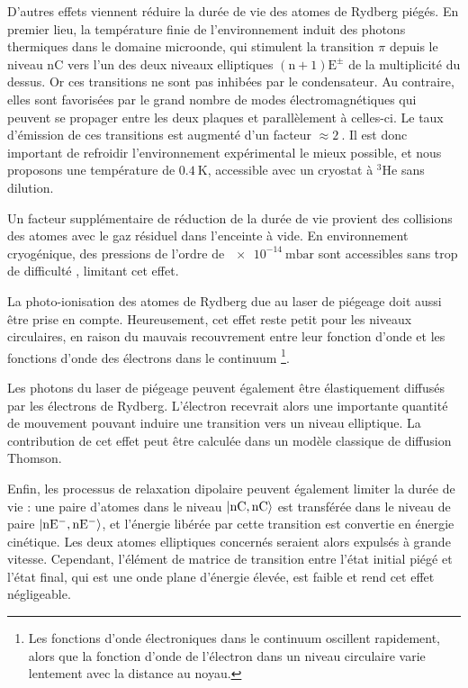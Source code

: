 D'autres effets viennent réduire la durée de vie des atomes de Rydberg piégés. %
%
En premier lieu, la température finie de l'environnement induit des photons thermiques dans le domaine microonde, qui stimulent la transition $\pi$ depuis le niveau $\mathrm{nC}$ vers l'un des deux niveaux elliptiques $\mathrm{(n+1)E^\pm}$ de la multiplicité du dessus.
Or ces transitions ne sont pas inhibées par le condensateur.
Au contraire, elles sont favorisées par le grand nombre de modes électromagnétiques qui peuvent se propager entre les deux plaques et parallèlement à celles-ci.
Le taux d'émission de ces transitions est augmenté d'un facteur $\approx \SI{2}{}$.
Il est donc important de refroidir l'environnement expérimental le mieux possible, et nous proposons une température de $\SI{0.4}{\K}$, accessible avec un cryostat à $^3$He sans dilution.

Un facteur supplémentaire de réduction de la durée de vie provient des collisions des atomes avec le gaz résiduel dans l'enceinte à vide.
En environnement cryogénique, des pressions de l'ordre de $\SI{e-14}{\milli\bar}$ sont accessibles sans trop de difficulté \cite{MX_GABRIELSEANTIPROTON90,MX_WERTHCRYOION98}, limitant cet effet.

La photo-ionisation des atomes de Rydberg due au laser de piégeage doit aussi être prise en compte.
Heureusement, cet effet reste petit pour les niveaux circulaires, en raison du mauvais recouvrement entre leur fonction d'onde et les fonctions d'onde des électrons dans le continuum
\footnote{Les fonctions d'onde électroniques dans le continuum oscillent rapidement, alors que la fonction d'onde de l'électron dans un niveau circulaire varie lentement avec la distance au noyau.}.

Les photons du laser de piégeage peuvent également être élastiquement diffusés par les électrons de Rydberg. L'électron recevrait alors une importante quantité de mouvement pouvant induire une transition vers un niveau elliptique.
La contribution de cet effet peut être calculée dans un modèle classique de diffusion Thomson.

Enfin, les processus de relaxation dipolaire peuvent également limiter la durée de vie : une paire d'atomes dans le niveau $\ket{\mathrm{nC,nC}}$ est transférée dans le niveau de paire $\ket{\mathrm{nE^- , nE^-}}$, et l'énergie libérée par cette transition est convertie en énergie cinétique. Les deux atomes elliptiques concernés seraient alors expulsés à grande vitesse.
Cependant, l'élément de matrice de transition entre l'état initial piégé et l'état final, qui est une onde plane d'énergie élevée, est faible et rend cet effet négligeable.


